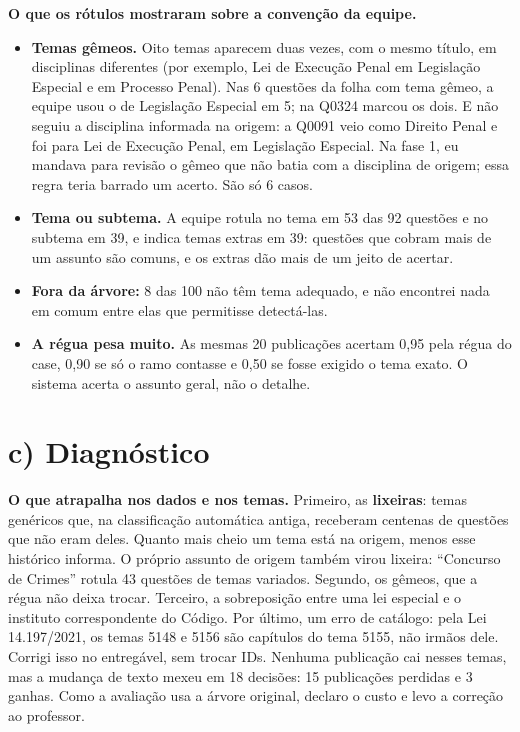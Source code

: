 \documentclass[11pt,a4paper]{article}
\newcommand{\bd}[1]{\textbf{#1}}
\begin{document}
\bd{O que os rótulos mostraram sobre a convenção da equipe.}
\begin{itemize}
\item \bd{Temas gêmeos.} Oito temas aparecem duas vezes, com o mesmo título, em disciplinas
      diferentes (por exemplo, Lei de Execução Penal em Legislação Especial e em Processo Penal).
      Nas 6 questões da folha com tema gêmeo, a equipe usou o de Legislação Especial em 5; na Q0324
      marcou os dois. E não seguiu a disciplina informada na origem: a Q0091 veio como Direito
      Penal e foi para Lei de Execução Penal, em Legislação Especial. Na fase 1, eu mandava para
      revisão o gêmeo que não batia com a disciplina de origem; essa regra teria barrado um acerto.
      São só 6 casos.
\item \bd{Tema ou subtema.} A equipe rotula no tema em 53 das 92 questões e no subtema em 39, e
      indica temas extras em 39: questões que cobram mais de um assunto são comuns, e os extras dão
      mais de um jeito de acertar.
\item \bd{Fora da árvore:} 8 das 100 não têm tema adequado, e não encontrei nada em comum entre
      elas que permitisse detectá-las.
\item \bd{A régua pesa muito.} As mesmas 20 publicações acertam 0,95 pela régua do case, 0,90 se
      só o ramo contasse e 0,50 se fosse exigido o tema exato. O sistema acerta o assunto geral,
      não o detalhe.
\end{itemize}

\section{c) Diagnóstico}

\bd{O que atrapalha nos dados e nos temas.} Primeiro, as \bd{lixeiras}: temas genéricos que, na
classificação automática antiga, receberam centenas de questões que não eram deles. Quanto mais
cheio um tema está na origem, menos esse histórico informa. O próprio assunto de origem também
virou lixeira: ``Concurso de Crimes'' rotula 43 questões de temas variados. Segundo, os gêmeos,
que a régua não deixa trocar. Terceiro, a sobreposição entre uma lei especial e o instituto
correspondente do Código. Por último, um erro de catálogo: pela Lei 14.197/2021, os temas 5148 e
5156 são capítulos do tema 5155, não irmãos dele. Corrigi isso no entregável, sem trocar IDs.
Nenhuma publicação cai nesses temas, mas a mudança de texto mexeu em 18 decisões: 15 publicações
perdidas e 3 ganhas. Como a avaliação usa a árvore original, declaro o custo e levo a correção ao
professor.
\end{document}
